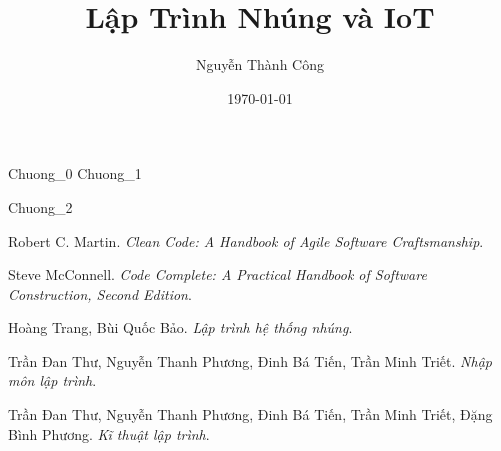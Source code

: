\documentclass[12pt,a5paper]{book}
\title{Lập Trình Nhúng và IoT}
\date{\today}
\author{Nguyễn Thành Công}
\begin{document}
\maketitle
{Chuong_0}
\tableofcontents
{Chuong_1}

{Chuong_2}



\begin{thebibliography}{9}
Robert C. Martin. 
\textit{Clean Code: A Handbook of Agile Software Craftsmanship}. 
 
Steve McConnell.
\textit{Code Complete: A Practical Handbook of Software Construction, Second Edition}.

Hoàng Trang, Bùi Quốc Bảo.
\textit{Lập trình hệ thống nhúng}.

Trần Đan Thư, Nguyễn Thanh Phương, Đinh Bá Tiến, Trần Minh Triết.
\textit{Nhập môn lập trình}.

Trần Đan Thư, Nguyễn Thanh Phương, Đinh Bá Tiến, Trần Minh Triết, Đặng Bình Phương.
\textit{Kĩ thuật lập trình}.

\end{thebibliography}
\end{document}

